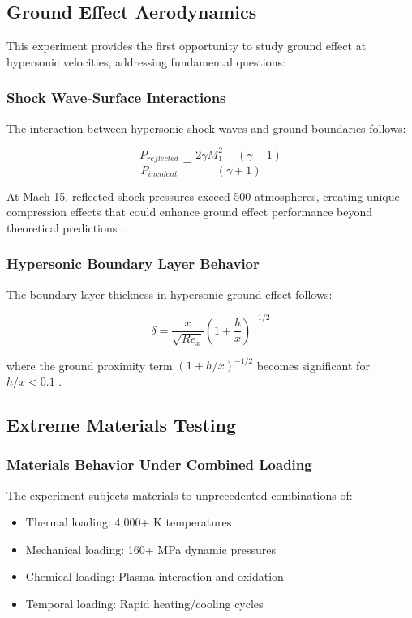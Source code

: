 \documentclass[12pt,a4paper]{article}
\begin{document}
\subsection{Ground Effect Aerodynamics}

This experiment provides the first opportunity to study ground effect at hypersonic velocities, addressing fundamental questions:

\subsubsection{Shock Wave-Surface Interactions}
The interaction between hypersonic shock waves and ground boundaries follows:

\begin{equation}
\frac{P_{reflected}}{P_{incident}} = \frac{2\gamma M_1^2 - (\gamma-1)}{(\gamma+1)}
\label{eq:shock_reflection}
\end{equation}

At Mach 15, reflected shock pressures exceed 500 atmospheres, creating unique compression effects that could enhance ground effect performance beyond theoretical predictions \cite{glass1974shock}.

\subsubsection{Hypersonic Boundary Layer Behavior}
The boundary layer thickness in hypersonic ground effect follows:

\begin{equation}
\delta = \frac{x}{\sqrt{Re_x}} \left(1 + \frac{h}{x}\right)^{-1/2}
\label{eq:boundary_layer_thickness}
\end{equation}

where the ground proximity term $(1 + h/x)^{-1/2}$ becomes significant for $h/x < 0.1$ \cite{schlichting2016boundary}.

\subsection{Extreme Materials Testing}

\subsubsection{Materials Behavior Under Combined Loading}
The experiment subjects materials to unprecedented combinations of:
\begin{itemize}
\item Thermal loading: 4,000+ K temperatures
\item Mechanical loading: 160+ MPa dynamic pressures  
\item Chemical loading: Plasma interaction and oxidation
\item Temporal loading: Rapid heating/cooling cycles
\end{itemize}
\end{document}
